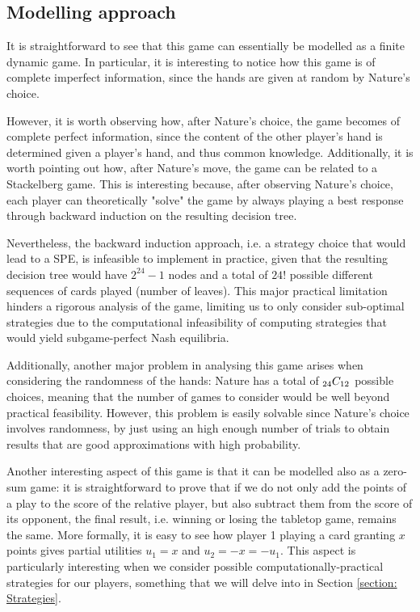 \subsection{Modelling approach}

It is straightforward to see that this game can essentially be modelled as a finite dynamic game.
In particular, it is interesting to notice how this game is of complete imperfect information, since the hands are given at random by Nature's choice.

However, it is worth observing how, after Nature's choice, the game becomes of complete perfect information, since the content of the other player's hand is determined given a player's hand, and thus common knowledge.
Additionally, it is worth pointing out how, after Nature's move, the game can be related to a Stackelberg game.
This is interesting because, after observing Nature's choice, each player can theoretically "solve" the game by always playing a best response through backward induction on the resulting decision tree.

Nevertheless, the backward induction approach, i.e. a strategy choice that would lead to a SPE, is infeasible to implement in practice, given that the resulting decision tree would have $2^24 - 1$ nodes and a total of $24!$ possible different sequences of cards played (number of leaves).
This major practical limitation hinders a rigorous analysis of the game, limiting us to only consider sub-optimal strategies due to the computational infeasibility of computing strategies that would yield subgame-perfect Nash equilibria.

Additionally, another major problem in analysing this game arises when considering the randomness of the hands: Nature has a total of ${}_{24}C_{12}$ possible choices, meaning that the number of games to consider would be well beyond practical feasibility.
However, this problem is easily solvable since Nature's choice involves randomness, by just using an high enough number of trials to obtain results that are good approximations with high probability.

Another interesting aspect of this game is that it can be modelled also as a zero-sum game: it is straightforward to prove that if we do not only add the points of a play to the score of the relative player, but also subtract them from the score of its opponent, the final result, i.e. winning or losing the tabletop game, remains the same. More formally, it is easy to see how player 1 playing a card granting $x$ points gives partial utilities $u_1 = x$ and $u_2 = -x = -u_1$.
This aspect is particularly interesting when we consider possible computationally-practical strategies for our players, something that we will delve into in Section \ref{section: Strategies}.

